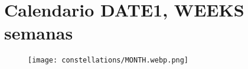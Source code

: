  

\newpage

\section*{Calendario DATE1, WEEKS semanas}

\begin{figure}[H]
    \centering
    \texttt{[image: constellations/MONTH.webp.png]}
\end{figure}


\newpage
$\;$
\newpage
